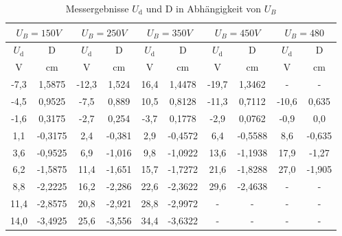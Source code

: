 



%


\begin{table}[h!]
  \centering
  \caption{Messergebnisse $U_\text{d}$ und D in Abhängigkeit von $U_B$}
  \label{tab:V501}
  \begin{tabular}{c c c c c c c c c c}
    \toprule
    \multicolumn{2}{c}{$U_B = 150V $} &   \multicolumn{2}{c}{$U_B = 250V$}&    \multicolumn{2}{c}{$U_B = 350V$}& \multicolumn{2}{c}{$U_B = 450V$}&  \multicolumn{2}{c}{$U_B = 480$}\\
      \midrule
    $U_\text{d}$ & $\text{D}$ & $U_\text{d}$ & $\text{D}$ & $U_\text{d}$ & $\text{D}$ & $U_\text{d}$ & $\text{D}$ & $U_\text{d}$ & $\text{D}$\\
      V &     cm &   V &     cm &   V &    cm  &  V  &  cm    &  V  & cm \\
    \midrule

    -7,3&			 1,5875& -12,3	&				 1,524& 16,4&					 1,4478 & -19,7&					 1,3462 & -&-\\
    -4,5&			 0,9525& -7,5 	&				 0,889& 10,5&					 0,8128 & -11,3&					 0,7112 & -10,6&					 0,635\\
    -1,6&			 0,3175& -2,7 	&				 0,254& -3,7&					 0,1778 &   -2,9&					 0,0762 &   -0,9&					 0,0\\
     1,1&			-0,3175&  2,4	  &				-0,381&  2,9&					-0,4572 &    6,4&					-0,5588 &    8,6&					-0,635\\
     3,6&			-0,9525&  6,9	  &				-1,016&  9,8&					-1,0922 &   13,6&					-1,1938 &   17,9&					-1,27\\
     6,2&			-1,5875& 11,4	  &				-1,651& 15,7&					-1,7272 &   21,6&					-1,8288 &   27,0&					-1,905\\
     8,8&			-2,2225& 16,2	  &				-2,286& 22,6&					-2,3622 &   29,6&					-2,4638 & -     &-           \\
     11,4&		-2,8575& 20,8	  &				-2,921& 28,8&					-2,9972 &      -&            -    &   -    & -     \\
     14,0&		-3,4925& 25,6	  &				-3,556& 34,4&					-3,6322 &     - &             -   &    -   &-      \\
    \bottomrule
  \end{tabular}
\end{table}

%
